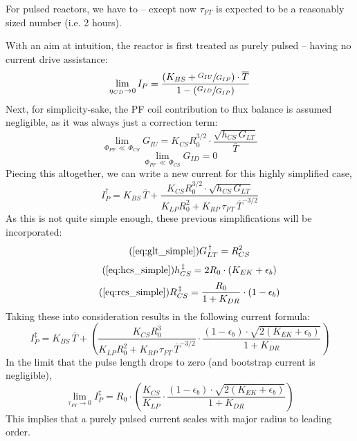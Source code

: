 For pulsed reactors, we have to  -- except now $\tau_{FT}$ is expected to be a reasonably sized number (i.e. 2 hours).

With an aim at intuition, the reactor is first treated as purely pulsed -- having no current drive assistance:
\begin{equation}
	\lim_{\eta_{CD} \to 0} I_P = \frac{ \left( K_{BS} + \sfrac{ G_{IU} }{ G_{IP} } \right) \cdot \overline T }{ 1 - \left( \sfrac{ G_{ID} }{ G_{IP} } \right) }
\end{equation}
Next, for simplicity-sake, the PF coil contribution to flux balance is assumed negligible, as it was always just a correction term:
\begin{equation}
	\lim_{ \Phi_{PF} \, \ll \, \Phi_{CS} } G_{IU} = K_{CS} R_0^{3/2} \cdot \frac{ \sqrt{ h_{CS} \, G_{LT} } }{ \overline T }
\end{equation}
\begin{equation}
	\lim_{ \Phi_{PF} \, \ll \, \Phi_{CS} } G_{ID} = 0
\end{equation}
Piecing this altogether, we can write a new current for this highly simplified case, 
\begin{equation}
	I_P^\dagger = K_{BS} \, \overline T + \frac{ K_{CS} R_0^{3/2} \cdot \sqrt{ h_{CS} \, G_{LT} } }{ K_{LP} R_0^2 + K_{RP} \, \tau_{FT} \, \overline T ^ {-3/2} }
\end{equation}
As this is not quite simple enough, these previous simplifications will be incorporated:
\begin{equation}
	\tag{\ref{eq:glt_simple}}
	G_{LT}^{\,\dagger} = R_{CS}^2
\end{equation}
\begin{equation}
	\tag{\ref{eq:hcs_simple}}
	h_{CS}^{\,\ddagger} = 2 R_0 \cdot \left( K_{EK} + \epsilon_b \right) 
\end{equation}
\begin{equation}
	\tag{\ref{eq:rcs_simple}}
	R_{CS}^{\,\ddagger} = \frac{ R_0 }{ 1 + K_{DR} } \cdot \left( 1 - \epsilon_b  \right)
\end{equation}
Taking these into consideration results in the following current formula:
\begin{equation}
	I_P^\ddagger = K_{BS} \, \overline T + \left( \frac{ K_{CS} R_0^3 }{ K_{LP} R_0^2 + K_{RP} \, \tau_{FT} \, \overline T ^ {-3/2} } \cdot \frac{ ( 1 - \epsilon_b ) \cdot \sqrt{ 2 ( K_{EK} + \epsilon_b ) } }{ 1 + K_{DR} } \right)
\end{equation}
In the limit that the pulse length drops to zero (and bootstrap current is negligible),
\begin{equation}
	\label{eq:tau_zero}
	\lim_{ \tau_{FT} \to 0 } I_P^\ddagger = R_0 \cdot \left( \frac{ K_{CS} }{ K_{LP} } \cdot \frac{ ( 1 - \epsilon_b ) \cdot \sqrt{ 2 ( K_{EK} + \epsilon_b ) } }{ 1 + K_{DR} } \right)
\end{equation}
This implies that a purely pulsed current scales with major radius to leading order.

